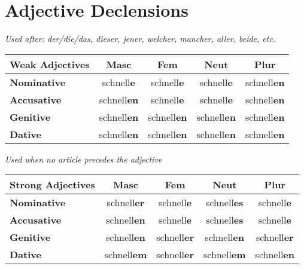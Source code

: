 \documentclass[a4paper,20pt]{article}
\newcommand{\grammarending}[1]{\textbf{\textcolor{endingcolor}{#1}}}
\begin{document}
\section{Adjective Declensions}

\textit{Used after: der/die/das, dieser, jener, welcher, mancher, aller, beide, etc.}

\begin{center}
\begin{tabular}{|l|c|c|c|c|}
\hline
\textbf{Weak Adjectives} & \textbf{Masc} & \textbf{Fem} & \textbf{Neut} & \textbf{Plur} \\
\hline
\textbf{Nominative} & schnell\grammarending{e} & schnell\grammarending{e} & schnell\grammarending{e} & schnell\grammarending{en} \\
\hline
\textbf{Accusative} & schnell\grammarending{en} & schnell\grammarending{e} & schnell\grammarending{e} & schnell\grammarending{en} \\
\hline
\textbf{Genitive} & schnell\grammarending{en} & schnell\grammarending{en} & schnell\grammarending{en} & schnell\grammarending{en} \\
\hline
\textbf{Dative} & schnell\grammarending{en} & schnell\grammarending{en} & schnell\grammarending{en} & schnell\grammarending{en} \\
\hline
\end{tabular}
\end{center}

\textit{Used when no article precedes the adjective}

\begin{center}
\begin{tabular}{|l|c|c|c|c|}
\hline
\textbf{Strong Adjectives} & \textbf{Masc} & \textbf{Fem} & \textbf{Neut} & \textbf{Plur} \\
\hline
\textbf{Nominative} & schnell\grammarending{er} & schnell\grammarending{e} & schnell\grammarending{es} & schnell\grammarending{e} \\
\hline
\textbf{Accusative} & schnell\grammarending{en} & schnell\grammarending{e} & schnell\grammarending{es} & schnell\grammarending{e} \\
\hline
\textbf{Genitive} & schnell\grammarending{en} & schnell\grammarending{er} & schnell\grammarending{en} & schnell\grammarending{er} \\
\hline
\textbf{Dative} & schnell\grammarending{em} & schnell\grammarending{er} & schnell\grammarending{em} & schnell\grammarending{en} \\
\hline
\end{tabular}
\end{center}
\end{document}
